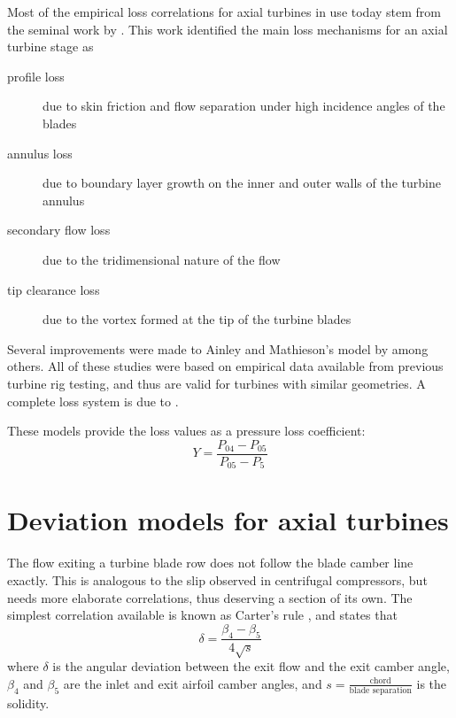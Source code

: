 Most of the empirical loss correlations for axial turbines in use today stem from the seminal work by \textcite{Ainley1951}. This work identified the main loss mechanisms for an axial turbine stage as 
\begin{description}
    \item[profile loss] due to skin friction and flow separation under high incidence angles of the blades
    \item[annulus loss] due to boundary layer growth on the inner and outer walls of the turbine annulus
    \item[secondary flow loss] due to the tridimensional nature of the flow
    \item[tip clearance loss] due to the vortex formed at the tip of the turbine blades
\end{description}

Several improvements were made to Ainley and Mathieson's model by \textcite{Mukhtarov1969, Dunham1970, Kacker1982, Moustapha1989, Benner1995} among others\cite{Persson2015}. All of these studies were based on empirical data available from previous turbine rig testing, and thus are valid for turbines with similar geometries. A complete loss system is due to \textcite{Aungier2006}.

These models provide the loss values as a pressure loss coefficient:
\begin{equation}
    Y = \frac{P_{04}-P_{05}}{P_{05}-P_5}
\end{equation}

\section{Deviation models for axial turbines}

The flow exiting a turbine blade row does not follow the blade camber line exactly. 
This is analogous to the slip observed in centrifugal compressors, but needs more elaborate correlations, 
thus deserving a section of its own. 
The simplest correlation available is known as Carter's rule \cite{Mattingly1996}, and states that
\begin{equation}
    \label{eqn:cartersrule}
    \delta = \frac{\beta_4-\beta_5}{4\sqrt{s}}
\end{equation}
where $\delta$ is the angular deviation between the exit flow and the exit camber angle,
$\beta_4$ and $\beta_5$ are the inlet and exit airfoil camber angles,
and $s=\frac{\text{chord}}{\text{blade separation}}$ is the solidity.

